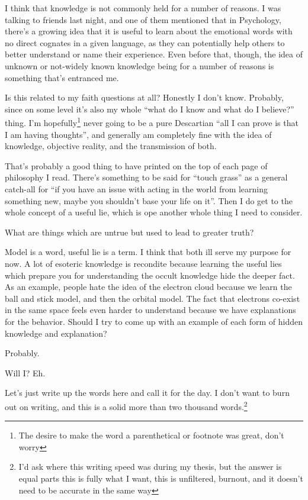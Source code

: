 \documentclass[12pt]{article}
\newcommand{\say}[1]{``#1''}
\renewcommand{\,}{\textsuperscript{,}}
\begin{document}
I think that knowledge is not commonly held for a number of reasons.  
I was talking to friends last night, and one of them mentioned that in Psychology, there's a growing idea that it is useful to learn about the emotional words with no direct cognates in a given language, as they can potentially help others to better understand or name their experience.  
Even before that, though, the idea of unknown or not-widely known knowledge being for a number of reasons is something that's entranced me.

Is this related to my faith questions at all?  
Honestly I don't know.  
Probably, since on some level it's also my whole \say{what do I know and what do I believe?} thing.  
I'm hopefully\footnote{The desire to make the word a parenthetical or footnote was great, don't worry} never going to be a pure Descartian \say{all I can prove is that I am having thoughts}, and generally am completely fine with the idea of knowledge, objective reality, and the transmission of both.

That's probably a good thing to have printed on the top of each page of philosophy I read.  
There's something to be said for \say{touch grass} as a general catch-all for \say{if you have an issue with acting in the world from learning something new, maybe you shouldn't base your life on it}.  
Then I do get to the whole concept of a useful lie, which is ope another whole thing I need to consider.

What are things which are untrue but used to lead to greater truth?

Model is a word, useful lie is a term.  
I think that both ill serve my purpose for now.  
A lot of esoteric knowledge is recondite because learning the useful lies which prepare you for understanding the occult knowledge hide the deeper fact.  
As an example, people hate the idea of the electron cloud because we learn the ball and stick model, and then the orbital model.  
The fact that electrons co-exist in the same space feels even harder to understand because we have explanations for the behavior.  
Should I try to come up with an example of each form of hidden knowledge and explanation?

Probably.

Will I?  
Eh.

Let's just write up the words here and call it for the day.  
I don't want to burn out on writing, and this is a solid more than two thousand words.\footnote{I'd ask where this writing speed was during my thesis, but the answer is equal parts this is fully what I want, this is unfiltered, burnout, and it doesn't need to be accurate in the same way}
\end{document}
